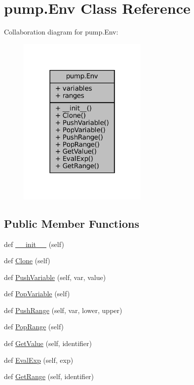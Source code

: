 \hypertarget{classpump_1_1Env}{}\section{pump.\+Env Class Reference}
\label{classpump_1_1Env}


Collaboration diagram for pump.\+Env\+:
\nopagebreak
\begin{figure}[H]
\begin{center}
\leavevmode
\includegraphics[width=178pt]{classpump_1_1Env__coll__graph}
\end{center}
\end{figure}
\subsection*{Public Member Functions}
\begin{DoxyCompactItemize}
\item 
def \hyperlink{classpump_1_1Env_a803732618a49ab4a2edf098b78081611}{\+\_\+\+\_\+init\+\_\+\+\_\+} (self)
\item 
def \hyperlink{classpump_1_1Env_a4c1b156cfa4aec708746bbe07dae5f1a}{Clone} (self)
\item 
def \hyperlink{classpump_1_1Env_ae0abc25733c61a8cc010cc5d76dd0dd8}{Push\+Variable} (self, var, value)
\item 
def \hyperlink{classpump_1_1Env_abf35f8b971acedb275bb92bb29fcd587}{Pop\+Variable} (self)
\item 
def \hyperlink{classpump_1_1Env_a600c34cac1e4ba75406efeadb2d7dd95}{Push\+Range} (self, var, lower, upper)
\item 
def \hyperlink{classpump_1_1Env_a45474355fc03b69e7449199cc8012ba9}{Pop\+Range} (self)
\item 
def \hyperlink{classpump_1_1Env_a43c3609179d5e458266731199e35313b}{Get\+Value} (self, identifier)
\item 
def \hyperlink{classpump_1_1Env_a29fa1ceb1f7c22e8e982133f4808317f}{Eval\+Exp} (self, exp)
\item 
def \hyperlink{classpump_1_1Env_a1df05a550bdcfe4bb8c5b1608484a6dc}{Get\+Range} (self, identifier)
\end{DoxyCompactItemize}
